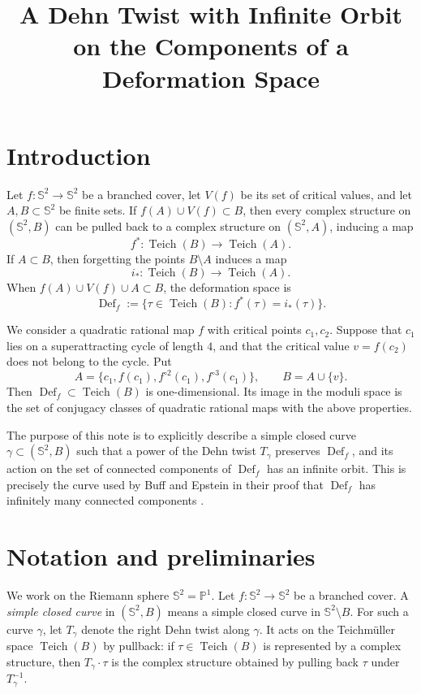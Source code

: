 \documentclass[12pt]{article}
\title{A Dehn Twist with Infinite Orbit on the Components of a Deformation Space}
\author{}
\date{}
\theoremstyle{definition}
\newcommand{\Sph}{\mathbb{S}^2}
\newcommand{\Pone}{\mathbb{P}^1}
\newcommand{\Teich}{\operatorname{Teich}}
\newcommand{\Def}{\operatorname{Def}}
\begin{document}
\maketitle

\section{Introduction}

Let \(f:\Sph\to\Sph\) be a branched cover, let \(V(f)\) be its set of critical values, and let \(A,B\subset\Sph\) be finite sets. If
\(f(A)\cup V(f)\subset B\), then every complex structure on \((\Sph,B)\) can be pulled back to a complex structure on \((\Sph,A)\), inducing a map
\[
f^*:\Teich(B)\longrightarrow \Teich(A).
\]
If \(A\subset B\), then forgetting the points \(B\setminus A\) induces a map
\[
i_*:\Teich(B)\longrightarrow \Teich(A).
\]
When \(f(A)\cup V(f)\cup A\subset B\), the deformation space is
\[
\Def_f :=\{\tau\in \Teich(B): f^*(\tau)=i_*(\tau)\}.
\]

We consider a quadratic rational map \(f\) with critical points \(c_1,c_2\). Suppose that \(c_1\) lies on a superattracting cycle of length \(4\), and that the critical value \(v=f(c_2)\) does not belong to the cycle. Put
\[
A=\{c_1,f(c_1),f^{\circ 2}(c_1),f^{\circ 3}(c_1)\},\qquad
B=A\cup\{v\}.
\]
Then \(\Def_f\subset \Teich(B)\) is one-dimensional. Its image in the moduli space is the set of conjugacy classes of quadratic rational maps with the above properties.

The purpose of this note is to explicitly describe a simple closed curve \(\gamma\subset(\Sph,B)\) such that a power of the Dehn twist \(T_\gamma\) preserves \(\Def_f\), and its action on the set of connected components of \(\Def_f\) has an infinite orbit. This is precisely the curve used by Buff and Epstein in their proof that \(\Def_f\) has infinitely many connected components \cite{BE}.

\section{Notation and preliminaries}

We work on the Riemann sphere \(\Sph=\Pone\). Let \(f:\Sph\to\Sph\) be a branched cover. A \emph{simple closed curve} in \((\Sph,B)\) means a simple closed curve in \(\Sph\setminus B\). For such a curve \(\gamma\), let \(T_\gamma\) denote the right Dehn twist along \(\gamma\). It acts on the Teichm\"uller space \(\Teich(B)\) by pullback: if \(\tau\in\Teich(B)\) is represented by a complex structure, then \(T_\gamma\cdot\tau\) is the complex structure obtained by pulling back \(\tau\) under \(T_\gamma^{-1}\).
\end{document}

